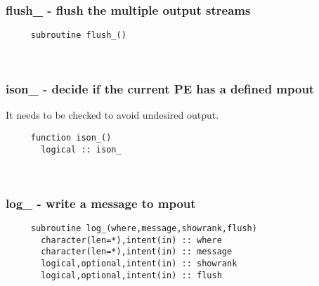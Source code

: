  
\mbox{}\hrulefill\ 
 
  \subsubsection{flush\_ - flush the multiple output streams}

\begin{verbatim} 
     subroutine flush_()
 \end{verbatim}%
 
 
\mbox{}\hrulefill\ 

  \subsubsection{ison\_ - decide if the current PE has a defined mpout}

     It needs to be checked to avoid undesired output.
  
\begin{verbatim} 
     function ison_()
       logical :: ison_
 \end{verbatim}%
 
 
\mbox{}\hrulefill\ 
 
  \subsubsection{log\_ - write a message to mpout}

\begin{verbatim} 
     subroutine log_(where,message,showrank,flush)
       character(len=*),intent(in) :: where
       character(len=*),intent(in) :: message
       logical,optional,intent(in) :: showrank
       logical,optional,intent(in) :: flush
 \end{verbatim}%
 
